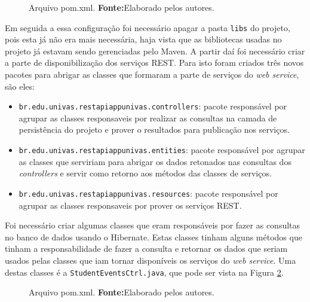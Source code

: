 	\begin{figure}[h!]
		
		\caption[Arquivo \texttt{pom.xml}]{Arquivo pom.xml.
		\textbf{Fonte:}Elaborado pelos autores.}
		\label{fig:desws18}
	\end{figure}

	\pagebreak
	
	\par Em seguida a essa configuração foi necessário apagar a pasta \texttt{libs}
do projeto, pois esta já não era mais necessária, haja vista que as bibliotecas
usadas no projeto já estavam sendo gerenciadas pelo Maven. A partir daí foi
necessário criar a parte de disponibilização dos serviços REST. Para isto foram
criados três novos pacotes para abrigar as classes que formaram a parte de
serviços do \textit{web service}, são eles:
	
	\begin{itemize}
	  \item \texttt{br.edu.univas.restapiappunivas.controllers}: pacote responsável
	  por agrupar as classes responsaveis por realizar as consultas na camada de
	  persistência do projeto e prover o resultados para publicação nos serviços.
	  \item \texttt{br.edu.univas.restapiappunivas.entities}: pacote responsável
	  por agrupar as classes que serviriam para abrigar os dados retonados nas
	  consultas dos \textit{controllers} e servir como retorno aos métodos das
	  classes de serviços.
	  \item \texttt{br.edu.univas.restapiappunivas.resources}: pacote responsável
	  por agrupar as classes responsaveis por prover os serviços REST.
	\end{itemize}


	\par Foi necessário criar algumas classes que eram responsáveis por fazer as
consultas no banco de dados usando o Hibernate. Estas classes tinham alguns
métodos que tinham a responsabilidade de fazer a consulta e retornar os dados
que seriam usados pelas classes que iam tornar disponíveis os serviços do
\textit{web service}. Uma destas classes é a \texttt{StudentEventsCtrl.java},
que pode ser vista na Figura \ref{fig:desws19}.
	
	\begin{figure}[h!]
		
		\caption[Arquivo \texttt{pom.xml}]{Arquivo pom.xml.
		\textbf{Fonte:}Elaborado pelos autores.}
		\label{fig:desws19}
	\end{figure}

